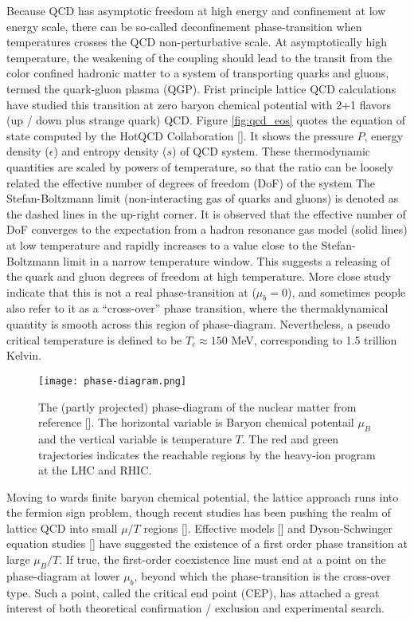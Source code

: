 Because QCD has asymptotic freedom at high energy and confinement at low energy scale, there can be so-called deconfinement phase-transition when temperatures crosses the QCD non-perturbative scale.
At asymptotically high temperature, the weakening of the coupling should lead to the transit from the color confined hadronic matter to a system of transporting quarks and gluons, termed the quark-gluon plasma (QGP). 
Frist principle lattice QCD calculations have studied this transition at zero baryon chemical potential with 2+1 flavors (up / down plus strange quark) QCD.
Figure \ref{fig:qcd_eos} quotes the equation of state computed by  the HotQCD Collaboration [].
It shows the pressure $P$, energy density ($\epsilon$) and entropy density ($s$) of QCD system.
These thermodynamic quantities are scaled by powers of temperature, so that the ratio can be loosely related the effective number of degrees of freedom (DoF) of the system
The Stefan-Boltzmann limit (non-interacting gas of quarks and gluons) is denoted as the dashed lines in the up-right corner.
It is observed that the effective number of DoF converges to the expectation from a hadron resonance gas model (solid lines) at low temperature and rapidly increases to a value close to the Stefan-Boltzmann limit in a narrow temperature window.
This suggests a releasing of the quark and gluon degrees of freedom at high temperature.
More close study indicate that this is not a real phase-transition at ($\mu_b = 0$), and sometimes people also refer to it as a ``cross-over'' phase transition, where the thermaldynamical quantity is smooth across this region of phase-diagram.
Nevertheless, a pseudo critical temperature is defined to be $T_c \approx 150 $ MeV, corresponding to 1.5 trillion Kelvin.

\begin{figure}
    \centering
    \texttt{[image: phase-diagram.png]}
    \caption{The (partly projected) phase-diagram of the nuclear matter from reference []. The horizontal variable is Baryon chemical potentail $\mu_B$ and the vertical variable is temperature $T$. The red and green trajectories indicates the reachable regions by the heavy-ion program at the LHC and RHIC.}
    \label{fig:phase-diagram}
\end{figure}

Moving to wards finite baryon chemical potential, the lattice approach runs into the fermion sign problem, though recent studies has been pushing the realm of lattice QCD into small $\mu/T$ regions [].
Effective models [] and Dyson-Schwinger equation studies [] have suggested the existence of a first order phase transition at large $\mu_B/T$.
If true, the first-order coexistence line must end at a point on the phase-diagram at lower $\mu_b$, beyond which the phase-transition is the cross-over type.
Such a point, called the critical end point (CEP), has attached a great interest of both theoretical confirmation / exclusion and experimental search.

